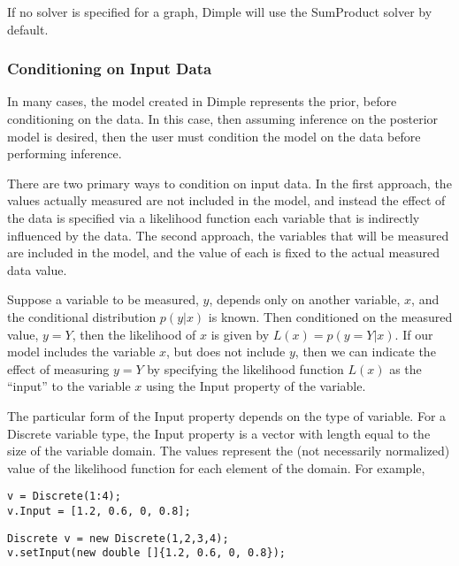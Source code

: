 If no solver is specified for a graph, Dimple will use the SumProduct solver by default.


\subsubsection{Conditioning on Input Data}

In many cases, the model created in Dimple represents the prior, before conditioning on the data.  In this case, then assuming inference on the posterior model is desired, then the user must condition the model on the data before performing inference.

There are two primary ways to condition on input data.  In the first approach, the values actually measured are not included in the model, and instead the effect of the data is specified via a likelihood function each variable that is indirectly influenced by the data.  The second approach, the variables that will be measured are included in the model, and the value of each is fixed to the actual measured data value.

\label{sec:LikelihoodInput}

Suppose a variable to be measured, $y$, depends only on another variable, $x$, and the conditional distribution $p(y|x)$ is known.  Then conditioned on the measured value, $y = Y$, then the likelihood of $x$ is given by $L(x) = p(y = Y | x)$.  If our model includes the variable $x$, but does not include $y$, then we can indicate the effect of measuring $y = Y$ by specifying the likelihood function $L(x)$ as the ``input'' to the variable $x$ using the Input property of the variable.

The particular form of the Input property depends on the type of variable.  For a Discrete variable type, the Input property is a vector with length equal to the size of the variable domain.  The values represent the (not necessarily normalized) value of the likelihood function for each element of the domain.  For example,

\ifmatlab

\begin{lstlisting}
v = Discrete(1:4);
v.Input = [1.2, 0.6, 0, 0.8];
\end{lstlisting}

\fi

\ifjava
\begin{lstlisting}
Discrete v = new Discrete(1,2,3,4);
v.setInput(new double []{1.2, 0.6, 0, 0.8});
\end{lstlisting}

